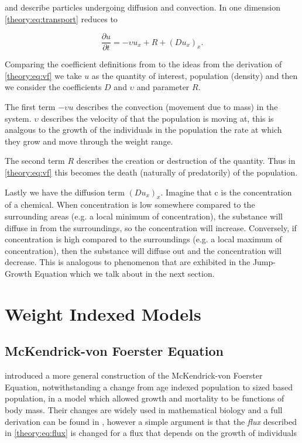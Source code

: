 \documentclass[../main]{subfiles}
\begin{document}
  and describe particles undergoing diffusion and convection. In one dimension \autoref{theory:eq:transport} reduces to

  \begin{equation}\label{theory:eq:transport1d}
    \frac{\partial u}{\partial t} = - \upsilon u_x + R + (D u_x)_x.
  \end{equation}

  Comparing the coefficient definitions from \cite{stocker2011} to the ideas from the derivation of \autoref{theory:eq:vf} we take $u$ as the quantity of interest, population (density) and then we consider the coefficients $D$ and $\upsilon$ and parameter $R$.

  The first term $-\upsilon u$ describes the convection (movement due to mass) in the system. $\upsilon$ describes the velocity of that the population is moving at, this is analgous to the growth of the individuals in the population the rate at which they grow and move through the weight range.

  The second term $R$ describes the creation or destruction of the quantity. Thus in \autoref{theory:eq:vf} this becomes the death (naturally of predatorily) of the population.

  Lastly we have the diffusion term $(D u_x)_x$. Imagine that c is the concentration of a chemical. When concentration is low somewhere compared to the surrounding areas (e.g. a local minimum of concentration), the substance will diffuse in from the surroundings, so the concentration will increase. Conversely, if concentration is high compared to the surroundings (e.g. a local maximum of concentration), then the substance will diffuse out and the concentration will decrease. This is analogous to phenomenon that are exhibited in the Jump-Growth Equation which we talk about in the next section.

  \section{Weight Indexed Models}
  \subsection{McKendrick-von Foerster Equation}\label{theory:sec:mvf}
  \cite{silvert1978} introduced a more general construction of the McKendrick-von Foerster Equation, notwithstanding a change from age indexed population to sized based population, in a model which allowed growth and mortality to be functions of body mass. Their changes are widely used in mathematical biology and a full derivation can be found in \cite{silvert1978}, however a simple argument is that the \emph{flux} described in \autoref{theory:eq:flux} is changed for a flux that depends on the growth of individuals
\end{document}
